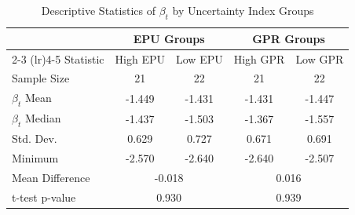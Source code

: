 \begin{table}[!htbp]
\centering
\caption{Descriptive Statistics of $\beta_t$ by Uncertainty Index Groups}
\label{tab:grouped_stats}
\begin{tabular}{lcccc}
\toprule
 & \multicolumn{2}{c}{EPU Groups} & \multicolumn{2}{c}{GPR Groups} \\
\cmidrule(lr){2-3} \cmidrule(lr){4-5}
Statistic & High EPU & Low EPU & High GPR & Low GPR \\
\midrule
Sample Size & 21 & 22 & 21 & 22 \\
$\beta_t$ Mean & -1.449 & -1.431 & -1.431 & -1.447 \\
$\beta_t$ Median & -1.437 & -1.503 & -1.367 & -1.557 \\
Std. Dev. & 0.629 & 0.727 & 0.671 & 0.691 \\
Minimum & -2.570 & -2.640 & -2.640 & -2.507 \\
\midrule
Mean Difference & \multicolumn{2}{c}{-0.018} & \multicolumn{2}{c}{0.016} \\
t-test p-value & \multicolumn{2}{c}{0.930} & \multicolumn{2}{c}{0.939} \\
\bottomrule
\end{tabular}
\end{table}